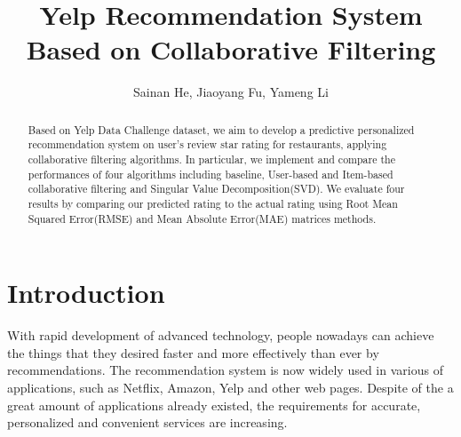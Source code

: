 \documentclass{llncs}
\begin{document}
%
\frontmatter          %
%
\pagestyle{headings}  %


%

%
\mainmatter              %
%
\title{Yelp Recommendation System Based on Collaborative Filtering}
%
%
\author{Sainan He, Jiaoyang Fu, Yameng Li}
%
%
%

\maketitle              %

\begin{abstract}

Based on Yelp Data Challenge dataset, we aim to develop a predictive personalized recommendation system on user’s review star rating for restaurants, applying collaborative filtering algorithms. In particular, we implement and compare the performances of four algorithms including baseline, User-based and Item-based collaborative filtering and Singular Value Decomposition(SVD). We evaluate four results by comparing our predicted rating to the actual rating using Root Mean Squared Error(RMSE) and Mean Absolute Error(MAE) matrices methods.

\end{abstract}

\section{Introduction}
With rapid development of advanced technology, people nowadays can achieve the things that they desired faster and more effectively than ever by recommendations. The recommendation system is now widely used in various of applications, such as Netflix, Amazon, Yelp and other web pages. Despite of the a great amount of applications already existed, the requirements for accurate, personalized and convenient services are increasing. 
\end{document}
